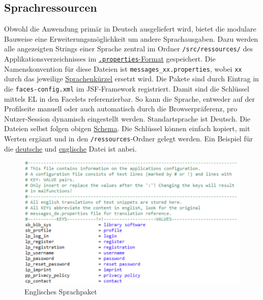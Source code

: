 \documentclass{article}
\begin{document}
\subsection{Sprachressourcen}
\indent Obwohl die Anwendung primär in Deutsch ausgeliefert wird, bietet die modulare Bauweise eine Erweiterungsmöglichkeit um andere Sprachausgaben. Dazu werden alle angezeigten Strings einer Sprache zentral im Ordner \texttt{/src/ressources/} des Applikationsverzeichnisses im \hyperlink{https://de.wikipedia.org/wiki/Java-Properties-Datei}{\texttt{.properties}-Format} gespeichert. Die Namenskonvention für diese Dateien ist \texttt{messages\_xx.properties}, wobei \texttt{xx} durch das jeweilige \hyperlink{https://de.wikipedia.org/wiki/Liste_der_ISO-639-1-Codes}{Sprachenkürzel} ersetzt wird. Die Pakete sind durch Eintrag in die \texttt{faces-config.xml} im JSF-Framework registriert. Damit sind die Schlüssel mittels EL in den Facelets referenzierbar. So kann die Sprache, entweder auf der Profilseite manuell oder auch automatisch durch die Browserpräferenz, pro Nutzer-Session dynamisch eingestellt werden. Standartsprache ist Deutsch. Die Dateien selbst folgen obigen \hyperlink{propSchema}{Schema}. Die Schlüssel können einfach kopiert, mit Werten ergänzt und in den \texttt{/ressources}-Ordner gelegt werden. Ein Beispiel für die \hyperlink{messagesde}{deutsche} und \hyperlink{messagesen}{englische} Datei ist anbei.

\begin{figure}
\hypertarget{messagesen}{}
\centering
\includegraphics[width=60em]{messagesen}
\caption{Englisches Sprachpaket}
\end{figure}
\end{document}
